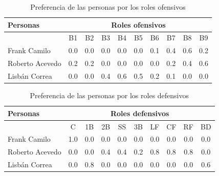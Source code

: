 \begin{table}[H]
		\centering
	\caption{Preferencia de las personas por los roles ofensivos}\label{pref-rol-of-pel}
	\begin{tabular}{l | c c c c c c c c c}
		\toprule[1.7pt]
		\multicolumn{1}{l}{\textbf{Personas}} &         \multicolumn{9}{c}{\textbf{Roles ofensivos}}         \\ \midrule
		                                                           & B1  & B2  & B3  & B4  & B5  & B6  & B7  & B8  & B9  \\ \cline{2-10}
		Frank Camilo                                               & 0.0 & 0.0 & 0.0 & 0.0 & 0.0 & 0.1 & 0.4 & 0.6 & 0.2 \\
		Roberto Acevedo                                            & 0.2 & 0.2 & 0.0 & 0.0 & 0.0 & 0.0 & 0.2 & 0.4 & 0.6 \\
		Lisbán Correa                                              & 0.0 & 0.0 & 0.4 & 0.6 & 0.5 & 0.2 & 0.1 & 0.0 & 0.0 \\
		\bottomrule[1.2pt]                          
	\end{tabular}
\end{table}

\begin{table}[H]
		\centering
	\caption{Preferencia de las personas por los roles defensivos}\label{pref-rol-def-pel}
		\begin{tabular}{l | c c c c c c c c c }
			\toprule[1.7pt]
			\multicolumn{1}{l}{\textbf{Personas}} &        \multicolumn{9}{c}{\textbf{Roles defensivos}}            \\ \midrule
			& C   & 1B  & 2B  & SS  & 3B  & LF  & CF  & RF  & BD    \\ \cline{2-10}
			Frank Camilo                                               & 1.0 & 0.0 & 0.0 & 0.0 & 0.0 & 0.0 & 0.0 & 0.0 & 0.0  \\
			Roberto Acevedo                                            & 0.0 & 0.0 & 0.4 & 0.4 & 0.2 & 0.8 & 0.8 & 0.8 & 0.0  \\
			Lisbán Correa                                              & 0.0 & 0.8 & 0.0 & 0.0 & 0.0 & 0.0 & 0.0 & 0.0 & 0.6  \\
			\bottomrule[1pt]                              
		\end{tabular}
	
\end{table}


